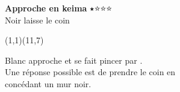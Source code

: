 \documentclass[preview, border=0pt, varwidth=false]{standalone}
\begin{document}
	\setgounit{0.6cm} 
	
\parbox[c][14.65cm][c]{10.2cm}{
	\centering
	
	{\Large\textbf{Approche en keima} $\medblackstar \medwhitestar  \medwhitestar \medwhitestar$  \\ Noir laisse le coin}
	\vspace{3em}
	
	\begin{psgopartialboard}{(1,1)(11,7)}
		\pass
	\end{psgopartialboard}
	
	\vspace{1em}
	Blanc approche et se fait pincer par . \\ Une réponse possible est de prendre le coin en \\ concédant un mur noir.
}
\end{document}
